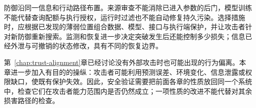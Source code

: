 防御沿同一信息和行动路径布置。来源审查不能消除已进入参数的后门，模型训练不能代替查询配额与执行授权，运行时过滤也不能自动修复持久污染。选择措施时，应根据已发现的薄弱位置组合数据、模型、接口与执行端保护，并让攻击者针对新防御重新搜索。监测和恢复进一步决定突破发生后还能控制多少损失；信息已经外泄与可撤销的状态修改，具有不同的恢复边界。

第~\ref{chap:trust-alignment}章已经讨论没有外部攻击时也可能出现的行为偏离。本章进一步加入有目的的操纵：攻击者可能利用预测误差、环境变化、信息泄露或权限缺口，使既有保护失效。因此，安全验证需要把前面各章的性质放回同一个系统中，检查它们在攻击者能力范围内是否仍然成立；一项性质的改进不能代替对其余损害路径的检查。
